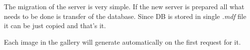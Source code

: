 The migration of the server is very simple.
If the new server is prepared all what needs to be done is transfer of the database.
Since DB is stored in single \emph{.mdf} file it can be just copied and that's it. 

Each image in the gallery will generate automatically on the first request for it.

















